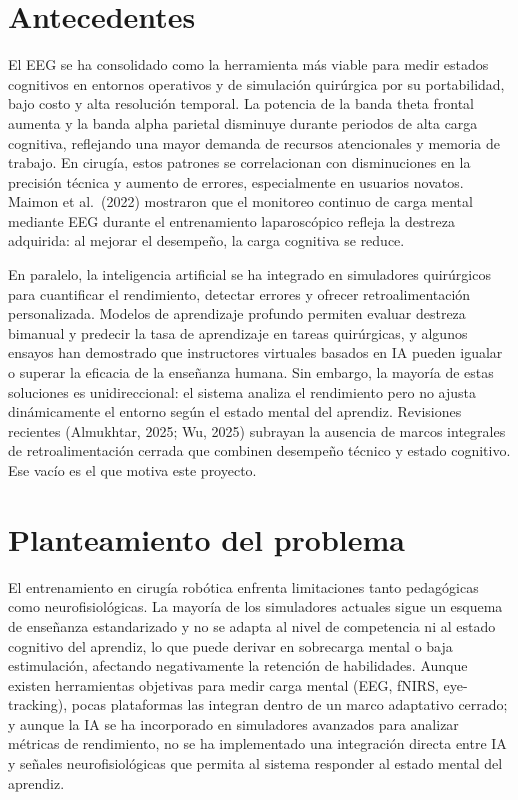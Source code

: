\documentclass[12pt]{article}
\begin{document}

\section{Antecedentes}

El EEG se ha consolidado como la herramienta más viable para
medir estados cognitivos en entornos operativos y de simulación
quirúrgica por su portabilidad, bajo costo y alta resolución
temporal. La potencia de la banda theta frontal aumenta y la
banda alpha parietal disminuye durante periodos de alta carga
cognitiva, reflejando una mayor demanda de recursos atencionales
y memoria de trabajo. En cirugía, estos patrones se correlacionan
con disminuciones en la precisión técnica y aumento de errores,
especialmente en usuarios novatos. Maimon et al.\ (2022) mostraron
que el monitoreo continuo de carga mental mediante EEG durante el
entrenamiento laparoscópico refleja la destreza adquirida: al
mejorar el desempeño, la carga cognitiva se reduce.

En paralelo, la inteligencia artificial se ha integrado en
simuladores quirúrgicos para cuantificar el rendimiento, detectar
errores y ofrecer retroalimentación personalizada. Modelos de
aprendizaje profundo permiten evaluar destreza bimanual y
predecir la tasa de aprendizaje en tareas quirúrgicas, y algunos
ensayos han demostrado que instructores virtuales basados en IA
pueden igualar o superar la eficacia de la enseñanza humana. Sin
embargo, la mayoría de estas soluciones es unidireccional: el
sistema analiza el rendimiento pero no ajusta dinámicamente el
entorno según el estado mental del aprendiz. Revisiones recientes
(Almukhtar, 2025; Wu, 2025) subrayan la ausencia de marcos
integrales de retroalimentación cerrada que combinen desempeño
técnico y estado cognitivo. Ese vacío es el que motiva este
proyecto.


\section{Planteamiento del problema}

El entrenamiento en cirugía robótica enfrenta limitaciones tanto
pedagógicas como neurofisiológicas. La mayoría de los simuladores
actuales sigue un esquema de enseñanza estandarizado y no se
adapta al nivel de competencia ni al estado cognitivo del
aprendiz, lo que puede derivar en sobrecarga mental o baja
estimulación, afectando negativamente la retención de habilidades.
Aunque existen herramientas objetivas para medir carga mental
(EEG, fNIRS, eye-tracking), pocas plataformas las integran dentro
de un marco adaptativo cerrado; y aunque la IA se ha incorporado
en simuladores avanzados para analizar métricas de rendimiento,
no se ha implementado una integración directa entre IA y señales
neurofisiológicas que permita al sistema responder al estado
mental del aprendiz.
\end{document}
